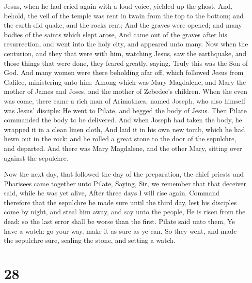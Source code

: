 Jesus, when he had cried again with a loud voice,
yielded up the ghost.  And, behold, the veil of the
temple was rent in twain from the top to the bottom; and the earth did
quake, and the rocks rent;  And the graves were opened;
and many bodies of the saints which slept arose,  And
came out of the graves after his resurrection, and went into the holy
city, and appeared unto many.  Now when the centurion,
and they that were with him, watching Jesus, saw the earthquake, and
those things that were done, they feared greatly, saying, Truly this was
the Son of God.  And many women were there beholding afar
off, which followed Jesus from Galilee, ministering unto him:
 Among which was Mary Magdalene, and Mary the mother of
James and Joses, and the mother of Zebedee's children. 
When the even was come, there came a rich man of Arimathæa, named
Joseph, who also himself was Jesus' disciple:  He went to
Pilate, and begged the body of Jesus. Then Pilate commanded the body to
be delivered.  And when Joseph had taken the body, he
wrapped it in a clean linen cloth,  And laid it in his
own new tomb, which he had hewn out in the rock: and he rolled a great
stone to the door of the sepulchre, and departed.  And
there was Mary Magdalene, and the other Mary, sitting over against the
sepulchre.

 Now the next day, that followed the day of the
preparation, the chief priests and Pharisees came together unto Pilate,
 Saying, Sir, we remember that that deceiver said, while
he was yet alive, After three days I will rise again. 
Command therefore that the sepulchre be made sure until the third day,
lest his disciples come by night, and steal him away, and say unto the
people, He is risen from the dead: so the last error shall be worse than
the first.  Pilate said unto them, Ye have a watch: go
your way, make it as sure as ye can.  So they went, and
made the sepulchre sure, sealing the stone, and setting a watch.

\hypertarget{section-27}{%
\section{28}\label{section-27}}

